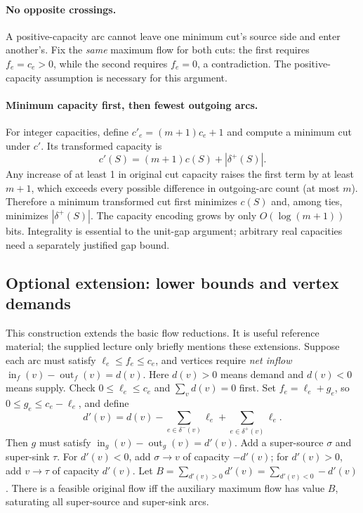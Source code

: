 \documentclass[10pt]{article}
\theoremstyle{definition}
\begin{document}
\paragraph{No opposite crossings.}
A positive-capacity arc cannot leave one minimum cut's source side and enter
another's. Fix the \emph{same} maximum flow for both cuts: the first requires
$f_e=c_e>0$, while the second requires $f_e=0$, a contradiction.
The positive-capacity assumption is necessary for this argument.

\paragraph{Minimum capacity first, then fewest outgoing arcs.}
For integer capacities, define $c'_e=(m+1)c_e+1$ and compute a minimum cut
under $c'$. Its transformed capacity is
\[
 c'(S)=(m+1)c(S)+|\delta^+(S)|.
\]
Any increase of at least 1 in original cut capacity raises the first term
by at least $m+1$, which exceeds every possible difference in outgoing-arc
count (at most $m$). Therefore a minimum transformed cut first minimizes
$c(S)$ and, among ties, minimizes $|\delta^+(S)|$. The capacity encoding grows
by only $O(\log(m+1))$ bits. Integrality is essential to the unit-gap argument;
arbitrary real capacities need a separately justified gap bound.

\subsection{Optional extension: lower bounds and vertex demands}\label{nf:demands}
This construction extends the basic flow reductions. It is useful reference
material; the supplied lecture only briefly mentions these extensions.
Suppose each arc must satisfy $\ell_e\le f_e\le c_e$, and vertices require
\emph{net inflow} $\operatorname{in}_f(v)-\operatorname{out}_f(v)=d(v)$.
Here $d(v)>0$ means demand and $d(v)<0$ means supply. Check
$0\le\ell_e\le c_e$ and $\sum_v d(v)=0$ first.
Set $f_e=\ell_e+g_e$, so $0\le g_e\le c_e-\ell_e$, and define
\[
 d'(v)=d(v)-\sum_{e\in\delta^-(v)}\ell_e
                  +\sum_{e\in\delta^+(v)}\ell_e.
\]
Then $g$ must satisfy $\operatorname{in}_g(v)-\operatorname{out}_g(v)=d'(v)$.
Add a super-source $\sigma$ and super-sink $\tau$. For $d'(v)<0$, add
$\sigma\to v$ of capacity $-d'(v)$; for $d'(v)>0$, add $v\to\tau$ of
capacity $d'(v)$. Let
$B=\sum_{d'(v)>0}d'(v)=\sum_{d'(v)<0}-d'(v)$.
There is a feasible original flow iff the auxiliary maximum flow has value
$B$, saturating all super-source and super-sink arcs.
\end{document}
